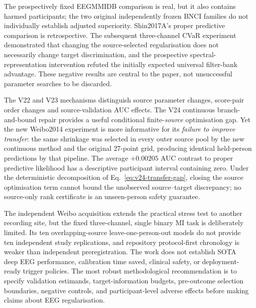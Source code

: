 \documentclass[11pt,a4paper]{article}
\begin{document}
The prospectively fixed EEGMMIDB comparison is real, but it also
contains harmed participants; the two original independently frozen
BNCI families do not individually establish adjusted superiority.
Shin2017A's proper predictive comparison is retrospective.
The subsequent three-channel CVaR experiment demonstrated
that changing the source-selected regularisation does not
necessarily change target discrimination, and the prospective
spectral-representation intervention refuted the initially
expected universal filter-bank advantage. These negative
results are central to the paper, not unsuccessful parameter
searches to be discarded.

The V22 and V23 mechanisms distinguish source parameter changes,
score-pair order changes and source-validation AUC effects.
The V24 continuous branch-and-bound repair provides a useful
conditional finite-\emph{source} optimisation gap. Yet the new
Weibo2014 experiment is more informative for its \emph{failure
to improve transfer}: the same shrinkage was selected
in every outer source pool by the new continuous method
and the original 27-point grid, producing identical
held-person predictions by that pipeline. The average
$+0.00205$ AUC contrast to proper predictive likelihood
has a descriptive participant interval containing zero.
Under the deterministic decomposition of
Eq.~\eqref{eq:v24-transfer-gap}, closing the source
optimisation term cannot bound the unobserved
source--target discrepancy; no source-only rank
certificate is an unseen-person safety guarantee.

The independent Weibo acquisition extends the practical
stress test to another recording site, but the fixed
three-channel, single binary MI task is deliberately
limited. Its ten overlapping-source leave-one-person-out
models do not provide ten independent study replications,
and repository protocol-first chronology is weaker than
independent preregistration. The work does not establish
SOTA deep EEG performance, calibration time saved,
clinical safety, or deployment-ready trigger policies.
The most robust methodological recommendation is to
specify validation estimands, target-information budgets,
pre-outcome selection boundaries, negative controls,
and participant-level adverse effects before making
claims about EEG regularisation.
\end{document}
